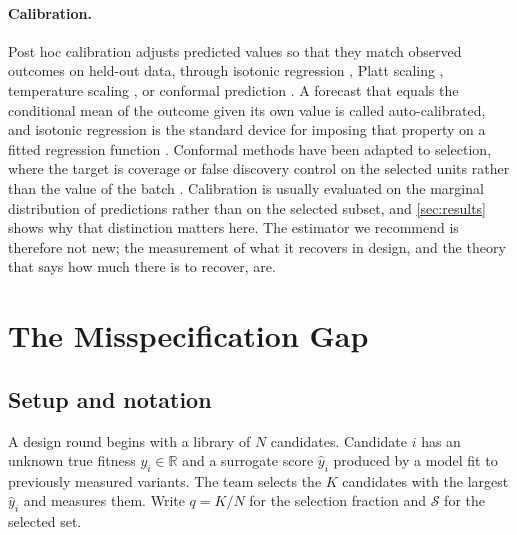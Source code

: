 \documentclass{article}
\theoremstyle{plain}
\theoremstyle{definition}
\newcommand{\yhat}{\hat{y}}
\newcommand{\Real}{\mathbb{R}}
\begin{document}
\paragraph{Calibration.}
Post hoc calibration adjusts predicted values so that they match observed outcomes on
held-out data, through isotonic regression \citep{zadrozny2002transforming}, Platt
scaling \citep{platt1999probabilistic}, temperature scaling
\citep{guo2017calibration}, or conformal prediction \citep{vovk2005algorithmic,
angelopoulos2023conformal}. A forecast that equals the conditional mean of the outcome
given its own value is called auto-calibrated, and isotonic regression is the standard
device for imposing that property on a fitted regression function
\citep{kruger2021generic, wuthrich2024isotonic}. Conformal methods have been adapted to
selection, where the target is coverage or false discovery control on the selected
units rather than the value of the batch \citep{jin2023selection}. Calibration is
usually evaluated on the marginal distribution of predictions rather than on the
selected subset, and \cref{sec:results} shows why that distinction matters here. The
estimator we recommend is therefore not new; the measurement of what it recovers in
design, and the theory that says how much there is to recover, are.

\section{The Misspecification Gap}
\label{sec:method}

\subsection{Setup and notation}
\label{sec:setup-notation}

A design round begins with a library of $N$ candidates. Candidate $i$ has an unknown
true fitness $y_i \in \Real$ and a surrogate score $\yhat_i$ produced by a model fit to
previously measured variants. The team selects the $K$ candidates with the largest
$\yhat_i$ and measures them. Write $q = K/N$ for the selection fraction and
$\mathcal{S}$ for the selected set.
\end{document}
